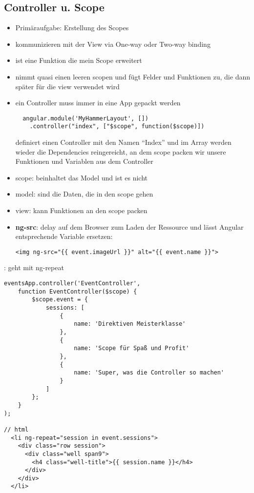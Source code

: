 \subsection{Controller u. Scope}
\begin{itemize}
  \item Primäraufgabe: Erstellung des Scopes
  \item kommunizieren mit der View via One-way oder Two-way binding
  \item ist eine Funktion die mein Scope erweitert
  \item nimmt quasi einen leeren scopen und fügt Felder und Funktionen zu, die dann später für die view verwendet wird
  \item ein Controller muss immer in eine App gepackt werden
    \begin{verbatim}
  angular.module('MyHammerLayout', [])
    .controller("index", ["$scope", function($scope)])
    \end{verbatim}
    definiert einen Controller mit den Namen \enquote{Index} und im Array
    werden wieder die Dependencies reingereicht, an dem scope packen wir unsere Funktionen und Variablen aus dem
    Controller
  \item scope: beinhaltet das Model und ist es nicht
  \item model: sind die Daten, die in den scope gehen
  \item view: kann Funktionen an den scope packen
  \item \textbf{ng-src}: delay auf dem Browser zum Laden der Ressource und lässt Angular
    entsprechende Variable ersetzen:
    \begin{verbatim}
<img ng-src="{{ event.imageUrl }}" alt="{{ event.name }}">
    \end{verbatim}
\end{itemize}


: geht mit ng-repeat


\begin{verbatim}
eventsApp.controller('EventController',
    function EventController($scope) {
        $scope.event = {
            sessions: [
                {
                    name: 'Direktiven Meisterklasse'
                },
                {
                    name: 'Scope für Spaß und Profit'
                },
                {
                    name: 'Super, was die Controller so machen'
                }
            ]
        };
    }
);

// html
  <li ng-repeat="session in event.sessions">
    <div class="row session">
      <div class="well span9">
        <h4 class="well-title">{{ session.name }}</h4>
      </div>
    </div>
  </li>
\end{verbatim}


